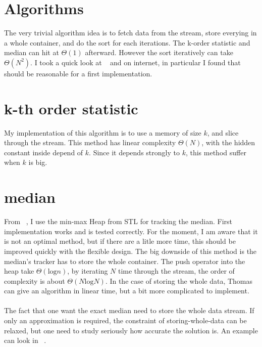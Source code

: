 \documentclass[a4paper,10pt]{article}
\begin{document}
\section{Algorithms}
The very trivial algorithm idea is to fetch data from the stream, store everying in a whole container, and do the sort for each iterations. The k-order statistic and median can hit at $\Theta(1)$ afterward. However the sort iteratively can take $\Theta(N^2)$. I took a quick look at ~\cite{THOMAS} and on internet, in particular I found that ~\cite{STACKOVERFLOW} should be reasonable for a first implementation. 
\section{k-th order statistic}
My implementation of this algorithm is to use a memory of size $k$, and slice through the stream. This method has linear complexity $\Theta(N)$, with the hidden constant inside depend of $k$. Since it depends strongly to $k$, this method suffer when $k$ is big.
\section{median}
From ~\cite{STACKOVERFLOW}, I use the min-max Heap from STL for tracking the median. First implementation works and is tested correctly. For the moment, I am aware that it is not an optimal method, but if there are a litle more time, this should be improved quickly with the flexible design. The big downside of this method is the median's tracker has to store the whole container. The push operator into the heap take $\Theta(\text{log}n)$, by iterating $N$ time through the stream, the order of complexity is about $\Theta(N\text{log}N)$. In the case of storing the whole data, Thomas ~\cite{THOMAS} can give an algorithm in linear time, but a bit more complicated to implement. 
\paragraph{} The fact that one want the exact median need to store the whole data stream. If only an approximation is required, the constraint of storing-whole-data can be relaxed, but one need to study seriously how accurate the solution is. An example can look in  ~\cite{PETER1990}. 
\end{document}
